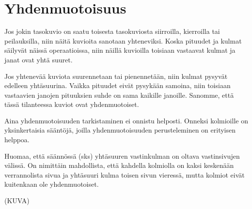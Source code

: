 \section*{Yhdenmuotoisuus}

Jos jokin tasokuvio on saatu toisesta tasokuviosta siirroilla, kierroilla tai
peilauksilla, niin näitä kuvioita sanotaan yhteneviksi. Koska pituudet ja kulmat säilyvät
näissä operaatioissa, niin näillä kuvioilla toisiaan vastaavat kulmat ja janat
ovat yhtä suuret.

Jos yhtenevää kuviota suurennetaan tai pienennetään, niin kulmat pysyvät edelleen yhtäsuurina.
Vaikka pituudet eivät pysykään samoina, niin toisiaan vastaavien janojen pituuksien suhde
on sama kaikille janoille. Sanomme, että tässä tilanteessa kuviot ovat yhdenmuotoiset.


Aina yhdenmuotoisuuden tarkistaminen ei onnistu helposti. Onneksi kolmioille on yksinkertaisia
sääntöjä, joilla yhdenmuotoisuuden perusteleminen on erityisen helppoa.


Huomaa, että säännössä (sks) yhtäsuuren vastinkulman on oltava vastinsivujen välissä. On
nimittäin mahdollista, että kahdella kolmiolla on kaksi keskenään verrannolista sivua
ja yhtäsuuri kulma toisen sivun vieressä, mutta kolmiot eivät kuitenkaan ole yhdenmuotoiset.

(KUVA)

